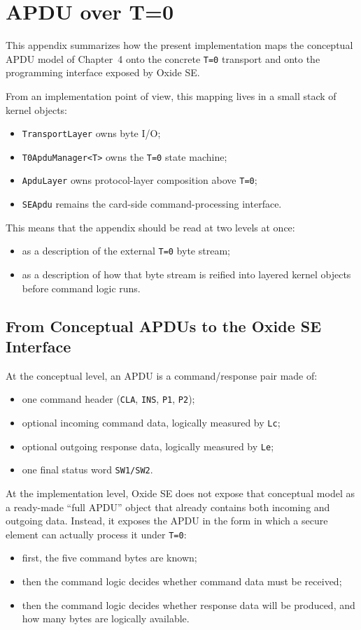 \chapter{APDU over T=0}
\label{app:apdu-over-t0}

This appendix summarizes how the present implementation maps the
conceptual APDU model of Chapter~4 onto the concrete \texttt{T=0}
transport and onto the programming interface exposed by Oxide SE.

From an implementation point of view, this mapping lives in a small
stack of kernel objects:
\begin{itemize}
\item \texttt{TransportLayer} owns byte I/O;
\item \texttt{T0ApduManager<T>} owns the \texttt{T=0} state machine;
\item \texttt{ApduLayer} owns protocol-layer composition above
  \texttt{T=0};
\item \texttt{SEApdu} remains the card-side command-processing
  interface.
\end{itemize}

This means that the appendix should be read at two levels at once:
\begin{itemize}
\item as a description of the external \texttt{T=0} byte stream;
\item as a description of how that byte stream is reified into layered
  kernel objects before command logic runs.
\end{itemize}

\section{From Conceptual APDUs to the Oxide SE Interface}

At the conceptual level, an APDU is a command/response pair made of:
\begin{itemize}
\item one command header (\texttt{CLA}, \texttt{INS}, \texttt{P1},
  \texttt{P2});
\item optional incoming command data, logically measured by
  \texttt{Lc};
\item optional outgoing response data, logically measured by
  \texttt{Le};
\item one final status word \texttt{SW1/SW2}.
\end{itemize}

At the implementation level, Oxide SE does not expose that conceptual
model as a ready-made ``full APDU'' object that already contains both
incoming and outgoing data. Instead, it exposes the APDU in the form in
which a secure element can actually process it under \texttt{T=0}:
\begin{itemize}
\item first, the five command bytes are known;
\item then the command logic decides whether command data must be
  received;
\item then the command logic decides whether response data will be
  produced, and how many bytes are logically available.
\end{itemize}

